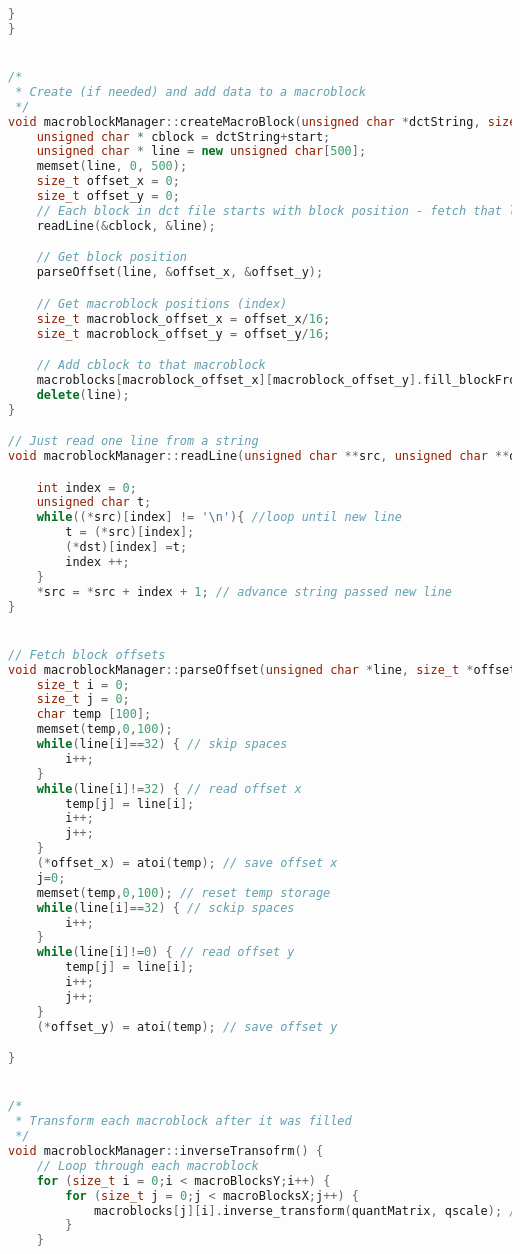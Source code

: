 \documentclass{report}
\begin{document}
\begin{lstlisting}[language=C++]
    }
}


/*
 * Create (if needed) and add data to a macroblock
 */
void macroblockManager::createMacroBlock(unsigned char *dctString, size_t start, size_t anEnd) {
    unsigned char * cblock = dctString+start;
    unsigned char * line = new unsigned char[500];
    memset(line, 0, 500);
    size_t offset_x = 0;
    size_t offset_y = 0;
    // Each block in dct file starts with block position - fetch that line
    readLine(&cblock, &line);

    // Get block position
    parseOffset(line, &offset_x, &offset_y);

    // Get macroblock positions (index)
    size_t macroblock_offset_x = offset_x/16;
    size_t macroblock_offset_y = offset_y/16;

    // Add cblock to that macroblock
    macroblocks[macroblock_offset_x][macroblock_offset_y].fill_blockFromDCT(cblock, offset_x, offset_y);
    delete(line);
}

// Just read one line from a string
void macroblockManager::readLine(unsigned char **src, unsigned char **dst) {

    int index = 0;
    unsigned char t;
    while((*src)[index] != '\n'){ //loop until new line
        t = (*src)[index];
        (*dst)[index] =t;
        index ++;
    }
    *src = *src + index + 1; // advance string passed new line
}


// Fetch block offsets
void macroblockManager::parseOffset(unsigned char *line, size_t *offset_x, size_t *offset_y) {
    size_t i = 0;
    size_t j = 0;
    char temp [100];
    memset(temp,0,100);
    while(line[i]==32) { // skip spaces
        i++;
    }
    while(line[i]!=32) { // read offset x
        temp[j] = line[i];
        i++;
        j++;
    }
    (*offset_x) = atoi(temp); // save offset x
    j=0;
    memset(temp,0,100); // reset temp storage
    while(line[i]==32) { // sckip spaces
        i++;
    }
    while(line[i]!=0) { // read offset y
        temp[j] = line[i];
        i++;
        j++;
    }
    (*offset_y) = atoi(temp); // save offset y

}


/*
 * Transform each macroblock after it was filled
 */
void macroblockManager::inverseTransofrm() {
    // Loop through each macroblock
    for (size_t i = 0;i < macroBlocksY;i++) {
        for (size_t j = 0;j < macroBlocksX;j++) {
            macroblocks[j][i].inverse_transform(quantMatrix, qscale); // Make each macrobock to transform itself
        }
    }


\end{lstlisting}
\end{document}
